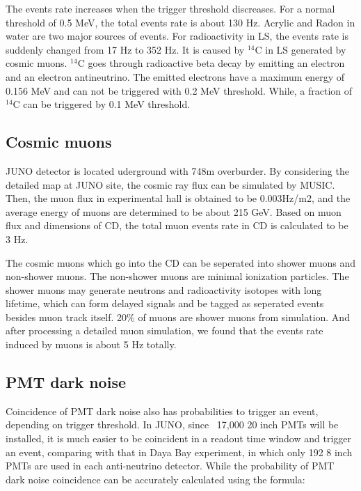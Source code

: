 \documentclass[a4paper,10pt,twoside]{paper}
\begin{document}
	\begin{multicols}{2}


		The events rate increases when the trigger threshold discreases. For a normal threshold of 0.5 MeV, the total events rate is about 130 Hz.
		Acrylic and Radon in water are two major sources of events. For radioactivity in LS, the events rate is suddenly changed from 17 Hz to 352 Hz.
		It is caused by $^{14}$C in LS generated by cosmic muons. $^{14}$C goes through radioactive beta decay by emitting an electron and an electron antineutrino.
		The emitted electrons have a maximum energy of 0.156 MeV and can not be triggered with 0.2 MeV threshold. 
		While, a fraction of $^{14}$C can be triggered by 0.1 MeV threshold.

		\subsection{Cosmic muons}
		JUNO detector is located uderground with 748m overburder. By considering the detailed map at JUNO site, the cosmic ray flux can be simulated by MUSIC.
		Then, the muon flux in experimental hall is obtained to be 0.003Hz/m2, and the average energy of muons are determined to be about 215 GeV.
		Based on muon flux and dimensions of CD, the total muon events rate in CD is calculated to be 3 Hz.

		The cosmic muons which go into the CD can be seperated into shower muons and non-shower muons. The non-shower muons are minimal ionization particles.
		The shower muons may generate neutrons and radioactivity isotopes with long lifetime, 
		which can form delayed signals and be tagged as seperated events besides muon track itself. 20\% of muons are shower muons from simulation.
		And after processing a detailed muon simulation, we found that the events rate induced by muons is about 5 Hz totally.


		\subsection{PMT dark noise}
		Coincidence of PMT dark noise also has probabilities to trigger an event, depending on trigger threshold.
		In JUNO, since ~17,000 20 inch PMTs will be installed, it is much easier to be coincident in a readout time window and trigger an event, 
		comparing with that in Daya Bay experiment, in which only 192 8 inch PMTs are used in each anti-neutrino detector.
		While the probability of PMT dark noise coincidence can be accurately calculated using the formula:


\end{multicols}
\end{document}
